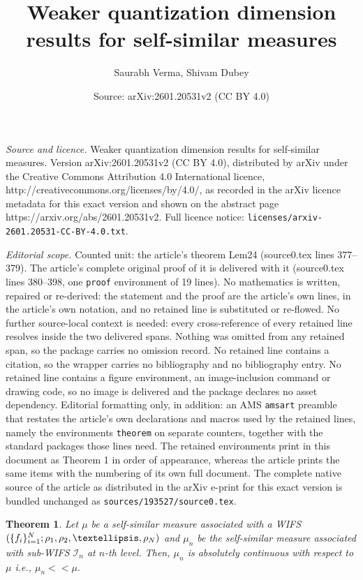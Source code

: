 \documentclass[10pt,a4paper]{amsart}
\title{Weaker quantization dimension results for self-similar measures}
\author{Saurabh Verma, Shivam Dubey}
\date{Source: arXiv:2601.20531v2 (CC BY 4.0)}
\newtheorem{theorem}{Theorem}
\begin{document}
\maketitle

\noindent\emph{Source and licence.} Weaker quantization dimension results for self-similar measures. Version arXiv:2601.20531v2 (CC BY 4.0), distributed by arXiv under the Creative Commons Attribution 4.0 International licence, http://creativecommons.org/licenses/by/4.0/, as recorded in the arXiv licence metadata for this exact version and shown on the abstract page https://arxiv.org/abs/2601.20531v2. Full licence notice: \texttt{licenses/arxiv-2601.20531-CC-BY-4.0.txt}.\par\smallskip

\noindent\textit{Editorial scope.} Counted unit: the article's theorem Lem24 (source0.tex lines 377--379). The article's complete original proof of it is delivered with it (source0.tex lines 380--398, one \texttt{proof} environment of 19 lines). No mathematics is written, repaired or re-derived: the statement and the proof are the article's own lines, in the article's own notation, and no retained line is substituted or re-flowed.  No further source-local context is needed: every cross-reference of every retained line resolves inside the two delivered spans.  Nothing was omitted from any retained span, so the package carries no omission record.  No retained line contains a citation, so the wrapper carries no bibliography and no bibliography entry.  No retained line contains a figure environment, an image-inclusion command or drawing code, so no image is delivered and the package declares no asset dependency.  Editorial formatting only, in addition: an AMS \texttt{amsart} preamble that restates the article's own declarations and macros used by the retained lines, namely the environments \texttt{theorem} on separate counters, together with the standard packages those lines need.  The retained environments print in this document as Theorem 1 in order of appearance, whereas the article prints the same items with the numbering of its own full document.  The complete native source of the article as distributed in the arXiv e-print for this exact version is bundled unchanged as \texttt{sources/193527/source0.tex}.
\begin{theorem}\label{Lem24}
    Let $\mu$ be a self-similar measure associated with a WIFS $(\{f_i\}_{i=1}^N; \\ \rho_1 ,\rho_2,\ldots,\rho_N)$ and $\mu_n$ be the self-similar measure associated with sub-WIFS $\mathcal{I}_n$ at $n$-th level. Then, $\mu_n$ is absolutely continuous with respect to $\mu$ i.e., $\mu_n << \mu.$
\end{theorem}
\end{document}
